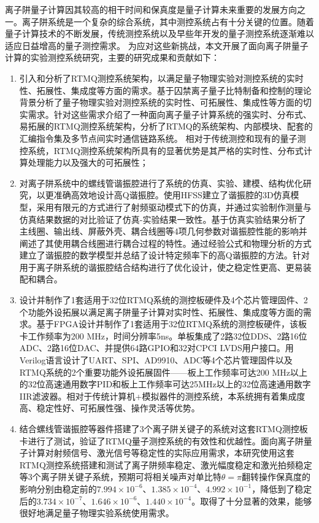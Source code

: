 
\begin{conclusion}

离子阱量子计算因其较高的相干时间和保真度是量子计算未来重要的发展方向之一。离子阱系统是一个复杂的综合系统，其中测控系统占有十分关键的位置。随着量子计算技术的不断发展，传统测控系统以及早些年开发的量子测控系统逐渐难以适应日益增高的量子测控需求。
为应对这些新挑战，本文开展了面向离子阱量子计算的实验测控系统研究，主要的研究成果和贡献如下：
\begin{enumerate}
    \item 引入和分析了RTMQ测控系统架构，以满足量子物理实验对测控系统的实时性、拓展性、集成度等方面的需求。基于囚禁离子量子比特制备和控制的理论背景分析了量子物理实验对测控系统的实时性、可拓展性、集成性等方面的切实需求。针对这些需求介绍了一种面向离子量子计算系统的强实时、分布式、易拓展的RTMQ测控系统架构，分析了RTMQ的系统架构、内部模块、配套的汇编指令集及多节点间实时通信链路系统。
    相对于传统测控和现有的量子测控系统，RTMQ测控系统架构所具有的显著优势是其严格的实时性、分布式计算处理能力以及强大的可拓展性；
    \item 对离子阱系统中的螺线管谐振腔进行了系统的仿真、实验、建模、结构优化研究，以更准确高效地设计高Q谐振腔。使用HFSS建立了谐振腔的3D仿真模型，采用有限元的方式进行了射频驱动模式下的仿真，并通过实验制作测量与仿真结果数据的对比验证了仿真-实验结果一致性。基于仿真实验结果分析了主线圈、输出线、屏蔽外壳、耦合线圈等4项几何参数对谐振腔性能的影响并阐述了其使用耦合线圈进行耦合过程的特性。通过经验公式和物理分析的方式建立了谐振腔的数学模型并总结了设计特定频率下的高Q谐振腔的方法。针对用于离子阱系统的谐振腔结合结构进行了优化设计，使之稳定性更高、更易装配和耦合。
    \item 设计并制作了1套适用于32位RTMQ系统的测控板硬件及4个芯片管理固件、2个功能外设拓展以满足离子阱量子计算对实时性、拓展性、集成度等方面的需求。基于FPGA设计并制作了1套适用于32位RTMQ系统的测控板硬件，该板卡工作频率为200 MHz，时间分辨率5ns。单板集成了2路32位DDS、2路16位ADC、2路16位DAC、并提供64路GPIO和32对CPCI LVDS用户接口。用Verilog语言设计了UART、SPI、AD9910、ADC等4个芯片管理固件以及RTMQ系统的2个重要功能外设拓展固件——板上工作频率可达200 MHz以上的32位高速通用数字PID和板上工作频率可达25MHz以上的32位高速通用数字IIR滤波器。相对于传统计算机+模拟器件的测控系统，本系统拥有着集成度高、稳定性好、可拓展性强、操作灵活等优势。
    \item 结合螺线管谐振腔等器件搭建了3个离子阱关键子的系统对这套RTMQ测控板卡进行了测试，验证了RTMQ量子测控系统的有效性和优越性。面向离子阱量子计算对射频信号、激光信号等稳定性的实际应用需求，本研究使用这套RTMQ测控系统搭建和测试了离子阱频率稳定、激光幅度稳定和激光拍频稳定等3个离子阱关键子系统，预期可将相关噪声对单比特$\theta=\pi$翻转操作保真度的影响分别由稳定前的$7.994\times10^{-6}$、$1.385\times 10^{-4}$、$4.992\times 10^{-1}$，降低到了稳定后的$3.734\times10^{-7}$、$1.646\times 10^{-6}$、$1.440\times 10^{-4}$。取得了十分显著的效果，能够很好地满足量子物理实验系统使用需求。
  \end{enumerate}


\end{conclusion}
